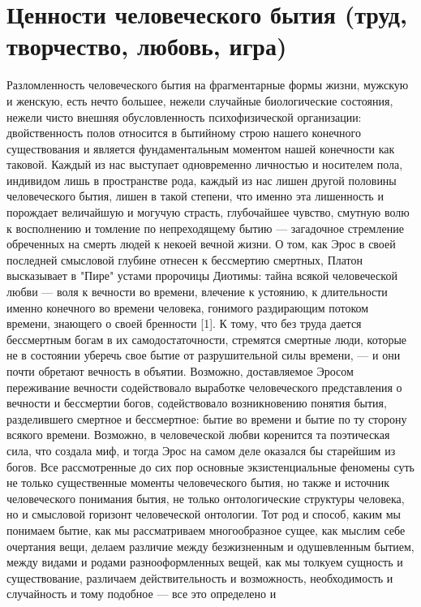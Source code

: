 \documentclass[12pt]{article}
\begin{document}
\section{Ценности человеческого бытия (труд, творчество, любовь, игра)}
Разломленность человеческого бытия на фрагментарные формы жизни, мужскую и женскую,
есть нечто большее, нежели случайные биологические состояния, нежели чисто внешняя
обусловленность  психофизической  организации:  двойственность  полов  относится  в
бытийному строю нашего конечного существования и является фундаментальным моментом
нашей конечности как таковой.
Каждый из нас выступает одновременно личностью и носителем пола, индивидом лишь в пространстве рода,
каждый  из  нас  лишен  другой  половины  человеческого  бытия,  лишен  в  такой  степени,  что  именно  эта
лишенность и порождает величайшую и могучую страсть, глубочайшее чувство, смутную волю к восполнению
и томление по непреходящему бытию --- загадочное стремление обреченных на смерть людей к некоей вечной
жизни.  О  том,  как  Эрос  в  своей  последней  смысловой  глубине  отнесен  к  бессмертию  смертных,  Платон
высказывает в "Пире" устами пророчицы Диотимы: тайна всякой человеческой любви --- воля к вечности во
времени, влечение к устоянию, к длительности именно конечного во времени человека, гонимого раздирающим
потоком времени, знающего о своей бренности [1]. К тому, что без труда дается бессмертным богам в их
самодостаточности, стремятся смертные люди, которые не в состоянии уберечь свое бытие от разрушительной
силы времени, --- и они почти обретают вечность в объятии. Возможно, доставляемое Эросом переживание
вечности содействовало выработке человеческого представления о вечности и бессмертии богов, содействовало
возникновению понятия бытия, разделившего смертное и бессмертное: бытие во времени и бытие по ту сторону
всякого времени. Возможно, в человеческой любви коренится та поэтическая сила, что создала миф, и тогда
Эрос  на  самом  деле  оказался  бы  старейшим  из  богов.  Все  рассмотренные  до  сих  пор  основные
экзистенциальные феномены суть не только существенные моменты человеческого бытия, но также и источник
человеческого  понимания  бытия, не  только онтологические  структуры человека,  но  и  смысловой  горизонт
человеческой онтологии. Тот род и способ, каким мы понимаем бытие, как мы рассматриваем многообразное
сущее, как мыслим себе очертания вещи, делаем различие между безжизненным и одушевленным бытием, 
между видами и родами разнооформленных вещей, как мы толкуем сущность и существование, различаем
действительность  и  возможность,  необходимость  и  случайность  и  тому  подобное  ---  все  это  определено  и
\end{document}
